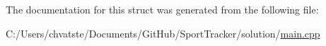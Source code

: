 The documentation for this struct was generated from the following file\+:\begin{DoxyCompactItemize}
\item 
C\+:/\+Users/chvatste/\+Documents/\+Git\+Hub/\+Sport\+Tracker/solution/\hyperlink{main_8cpp}{main.\+cpp}\end{DoxyCompactItemize}
